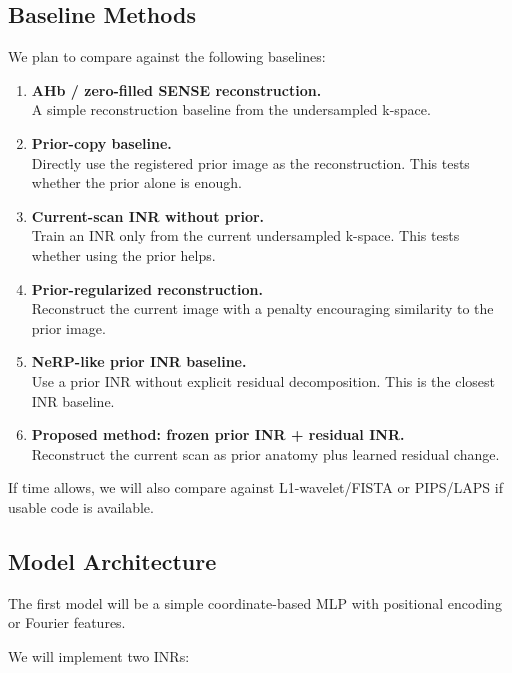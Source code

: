 \documentclass[11pt,a4paper]{article}
\begin{document}
\subsection{Baseline Methods}

We plan to compare against the following baselines:

\begin{enumerate}
    \item \textbf{AHb / zero-filled SENSE reconstruction.} \\
    A simple reconstruction baseline from the undersampled k-space.

    \item \textbf{Prior-copy baseline.} \\
    Directly use the registered prior image as the reconstruction. This tests whether the prior alone is enough.

    \item \textbf{Current-scan INR without prior.} \\
    Train an INR only from the current undersampled k-space. This tests whether using the prior helps.

    \item \textbf{Prior-regularized reconstruction.} \\
    Reconstruct the current image with a penalty encouraging similarity to the prior image.

    \item \textbf{NeRP-like prior INR baseline.} \\
    Use a prior INR without explicit residual decomposition. This is the closest INR baseline.

    \item \textbf{Proposed method: frozen prior INR + residual INR.} \\
    Reconstruct the current scan as prior anatomy plus learned residual change.
\end{enumerate}

If time allows, we will also compare against L1-wavelet/FISTA or PIPS/LAPS if usable code is available.

\subsection{Model Architecture}

The first model will be a simple coordinate-based MLP with positional encoding or Fourier features.

We will implement two INRs:
\end{document}
